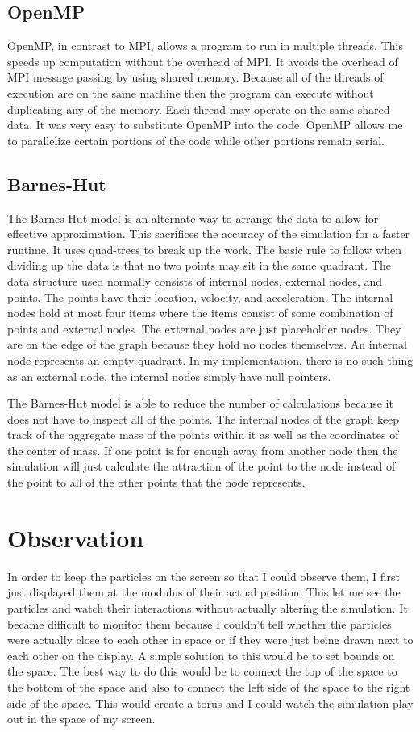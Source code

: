 \documentclass[12pt]{article}
\begin{document}
\subsection{OpenMP}
OpenMP, in contrast to MPI, allows a program to run in multiple threads. This speeds up computation without the overhead of MPI. It avoids the overhead of MPI message passing by using shared memory. Because all of the threads of execution are on the same machine then the program can execute without duplicating any of the memory. Each thread may operate on the same shared data. It was very easy to substitute OpenMP into the code. OpenMP allows me to parallelize certain portions of the code while other portions remain serial.
\subsection{Barnes-Hut}
The Barnes-Hut model is an alternate way to arrange the data to allow for effective approximation. This sacrifices the accuracy of the simulation for a faster runtime. It uses quad-trees to break up the work. The basic rule to follow when dividing up the data is that no two points may sit in the same quadrant. The data structure used normally consists of internal nodes, external nodes, and points. The points have their location, velocity, and acceleration. The internal nodes hold at most four items where the items consist of some combination of points and external nodes. The external nodes are just placeholder nodes. They are on the edge of the graph because they hold no nodes themselves. An internal node represents an empty quadrant. In my implementation, there is no such thing as an external node, the internal nodes simply have null pointers.

The Barnes-Hut model is able to reduce the number of calculations because it does not have to inspect all of the points. The internal nodes of the graph keep track of the aggregate mass of the points within it as well as the coordinates of the center of mass. If one point is far enough away from another node then the simulation will just calculate the attraction of the point to the node instead of the point to all of the other points that the node represents.
\section{Observation}
In order to keep the particles on the screen so that I could observe them, I first just displayed them at the modulus of their actual position. This let me see the particles and watch their interactions without actually altering the simulation. It became difficult to monitor them because I couldn't tell whether the particles were actually close to each other in space or if they were just being drawn next to each other on the display. A simple solution to this would be to set bounds on the space. The best way to do this would be to connect the top of the space to the bottom of the space and also to connect the left side of the space to the right side of the space. This would create a torus and I could watch the simulation play out in the space of my screen.
\end{document}
